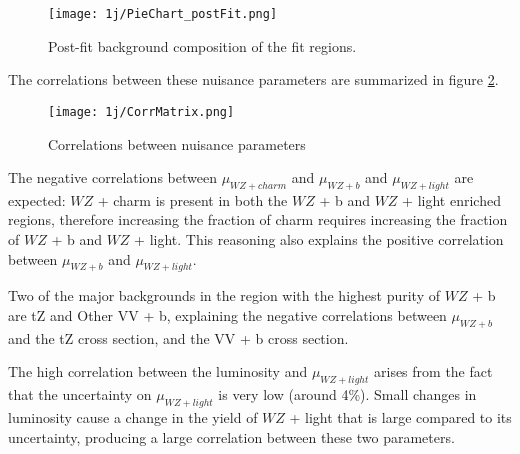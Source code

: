 \begin{figure}[H]
    \centering
    \texttt{[image: 1j/PieChart\_postFit.png]}
    \caption{Post-fit background composition of the fit regions.}
    \label{fig:pie_chart_1j}
\end{figure}

The correlations between these nuisance parameters are summarized in figure \ref{fig:corr_mat_1j}. 

\begin{figure}[H]
    \centering
    \texttt{[image: 1j/CorrMatrix.png]}
    \caption{Correlations between nuisance parameters}
    \label{fig:corr_mat_1j}
\end{figure}

The negative correlations between $\mu_{WZ+charm}$ and $\mu_{WZ+b}$ and $\mu_{WZ+light}$ are expected: $WZ$ + charm is present in both the $WZ$ + b and $WZ$ + light enriched regions, therefore increasing the fraction of charm requires increasing the fraction of $WZ$ + b and $WZ$ + light. This reasoning also explains the positive correlation between $\mu_{WZ+b}$ and $\mu_{WZ+light}$. 

Two of the major backgrounds in the region with the highest purity of $WZ$ + b are tZ and Other VV + b, explaining the negative correlations between $\mu_{WZ+b}$ and the tZ cross section, and the VV + b cross section.

The high correlation between the luminosity and $\mu_{WZ+light}$ arises from the fact that the uncertainty on $\mu_{WZ+light}$ is very low (around 4\%). Small changes in luminosity cause a change in the yield of $WZ$ + light that is large compared to its uncertainty, producing a large correlation between these two parameters. 



%        

